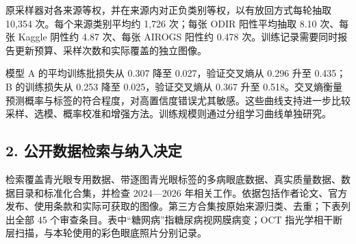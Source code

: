 \documentclass[
  10pt,
]{article}
\begin{document}
原采样器对各来源等权，并在来源内对正负类别等权，以有放回方式每轮抽取
10,354 次。每个来源类别平均约 1,726 次；每张 ODIR 阳性平均抽取 8.10
次、每张 Kaggle 阴性约 4.87 次、每张 AIROGS 阳性约 0.478
次。训练记录需要同时报告更新预算、采样次数和实际覆盖的独立图像。

模型 A 的平均训练批损失从 0.307 降至 0.027，验证交叉熵从 0.296 升至
0.435；B 的训练损失从 0.253 降至 0.025，验证交叉熵从 0.367 升至
0.518。交叉熵衡量预测概率与标签的符合程度，对高置信度错误尤其敏感。这些曲线支持进一步比较采样、选模、概率校准和增强方法。训练规模则通过分组学习曲线单独研究。

\subsection{2.
公开数据检索与纳入决定}\label{ux516cux5f00ux6570ux636eux68c0ux7d22ux4e0eux7eb3ux5165ux51b3ux5b9a}

检索覆盖青光眼专用数据、带逐图青光眼标签的多病眼底数据、真实质量数据、数据目录和标准化合集，并检查
2024---2026
年相关工作。依据包括作者论文、官方发布、使用条款和实际可获取的图像。第三方合集按原始来源归类、去重；下表列出全部
45 个审查条目。表中``糖网病''指糖尿病视网膜病变；OCT
指光学相干断层扫描，与本轮使用的彩色眼底照片分别记录。
\end{document}
